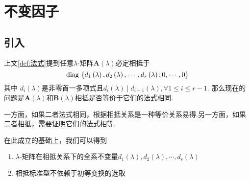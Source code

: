 \newpage
\section{不变因子}
\subsection{引入}
上文\cref{def:法式}提到任意$\lambda$-矩阵$\bm{A}\left(\lambda\right)$必定相抵于
\[
    \operatorname{diag\,} \left\{
    d_1\left(\lambda\right),d_2\left(\lambda\right),\cdots,d_r\left(\lambda\right);0,\cdots,0
    \right\}
\]其中
$d_i\left(\lambda\right)$是非零首一多项式且$d_i\left(\lambda\right)\mid d_{i+1}\left(\lambda\right),\forall 1\leqslant i\leqslant r-1.$
那么现在的问题是$\bm{A}\left(\lambda\right)$和$\bm{B}\left(\lambda\right)$相抵是否等价于它们的法式相同.

一方面，如果二者法式相同，根据相抵关系是一种等价关系易得.另一方面，如果二者相抵，需要证明它们的法式相等.

在此成立的基础上，我们可以得到\begin{enumerate}[label=\arabic*）]
    \item $\lambda$-矩阵在相抵关系下的全系不变量$d_1\left(\lambda\right),d_2\left(\lambda\right),\cdots,d_r\left(\lambda\right)$
    \item 相抵标准型不依赖于初等变换的选取
\end{enumerate}
